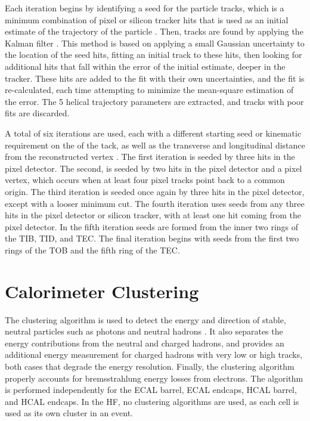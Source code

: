 \par Each iteration begins by identifying a seed for the particle
tracks, which is a minimum combination of pixel or silicon tracker
hits that is used as an initial estimate of the trajectory of the
particle \cite{Chatrchyan:2014fea}.  Then, tracks are found by applying
the Kalman filter \cite{Fruhwirth:1987fm}.  This method is based on
applying a small Gaussian uncertainty to the location of the seed
hits, fitting an initial track to these hits, then looking for
additional hits that fall within the error of the initial estimate,
deeper in the tracker.  These hits are added to the fit with their own
uncertainties, and the fit is re-calculated, each time attempting to
minimize the mean-square estimation of the error.  The 5 helical
trajectory parameters are extracted, and tracks with poor fits are
discarded.    

\par A total of six iterations are used, each with a different starting
seed or kinematic requirement on the \PT of the tack, as well as
the transverse and longitudinal distance from the reconstructed
vertex \cite{Fruhwirth:1987fm}.  The first iteration is seeded by
three hits in the pixel detector.  The second, is seeded by two hits
in the pixel detector and a pixel vertex, which occurs when at least
four pixel tracks point back to a common origin.  The third iteration
is seeded once again by three hits in the pixel detector, except with
a looser minimum \PT cut.  The fourth iteration uses seeds from any
three hits in the pixel detector or silicon tracker, with at least one
hit coming from the pixel detector.  In the fifth iteration seeds are
formed from the inner two rings of the TIB, TID, and TEC.  The final
iteration begins with seeds from the first two rings of the TOB and
the fifth ring of the TEC.   


\section{Calorimeter Clustering}
\label{calorimeter_clustering_overview}

\par The clustering algorithm is used to detect the energy and
direction of stable, neutral particles such as photons and neutral
hadrons \cite{CMS-PAS-PFT-09-001}.  It also separates the energy
contributions from the neutral and charged hadrons, and provides an
additional energy measurement for charged hadrons with very low or high
\PT tracks, both cases that degrade the energy resolution.  Finally,
the clustering algorithm properly accounts for bremsstrahlung energy
losses from electrons. The algorithm is performed independently for
the ECAL barrel, ECAL endcaps, HCAL barrel, and HCAL endcaps.  In the
HF, no clustering algorithms are used, as each cell is used as its own
cluster in an event.   

